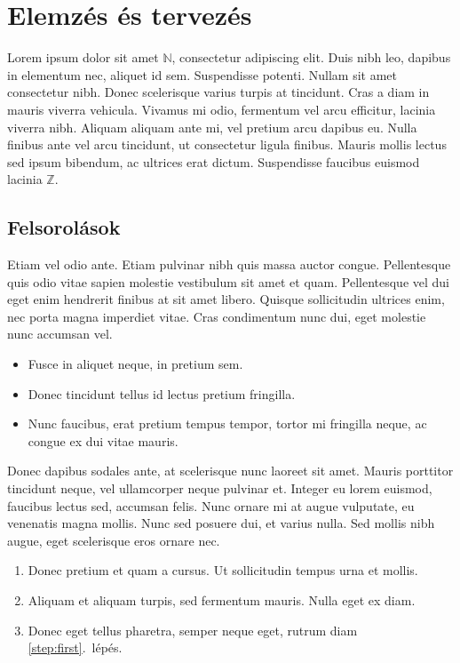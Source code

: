 \chapter{Elemzés és tervezés}
\label{ch:spec}

Lorem ipsum dolor sit amet $\mathbb{N}$, consectetur adipiscing elit. Duis nibh leo, dapibus in elementum nec, aliquet id sem. Suspendisse potenti. Nullam sit amet consectetur nibh. Donec scelerisque varius turpis at tincidunt. Cras a diam in mauris viverra vehicula. Vivamus mi odio, fermentum vel arcu efficitur, lacinia viverra nibh. Aliquam aliquam ante mi, vel pretium arcu dapibus eu. Nulla finibus ante vel arcu tincidunt, ut consectetur ligula finibus. Mauris mollis lectus sed ipsum bibendum, ac ultrices erat dictum. Suspendisse faucibus euismod lacinia $\mathbb{Z}$.


\section{Felsorolások}

Etiam vel odio ante. Etiam pulvinar nibh quis massa auctor congue. Pellentesque quis odio vitae sapien molestie vestibulum sit amet et quam. Pellentesque vel dui eget enim hendrerit finibus at sit amet libero. Quisque sollicitudin ultrices enim, nec porta magna imperdiet vitae. Cras condimentum nunc dui, eget molestie nunc accumsan vel.

\begin{itemize}
	\item Fusce in aliquet neque, in pretium sem.
	\item Donec tincidunt tellus id lectus pretium fringilla.
	\item Nunc faucibus, erat pretium tempus tempor, tortor mi fringilla neque, ac congue ex dui vitae mauris.
\end{itemize}

Donec dapibus sodales ante, at scelerisque nunc laoreet sit amet. Mauris porttitor tincidunt neque, vel ullamcorper neque pulvinar et. Integer eu lorem euismod, faucibus lectus sed, accumsan felis. Nunc ornare mi at augue vulputate, eu venenatis magna mollis. Nunc sed posuere dui, et varius nulla. Sed mollis nibh augue, eget scelerisque eros ornare nec.

\begin{enumerate}
	\item\label{step:first} Donec pretium et quam a cursus. Ut sollicitudin tempus urna et mollis.
	\item Aliquam et aliquam turpis, sed fermentum mauris. Nulla eget ex diam.
	\item Donec eget tellus pharetra, semper neque eget, rutrum diam \ref{step:first}.~lépés.
\end{enumerate}

